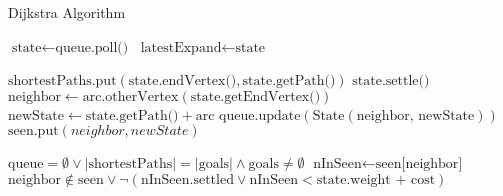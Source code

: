 \begin{algorithm}
    \caption{Dijkstra Algorithm}
    \label{alg:disjkstra_algorithm}
    \begin{algorithmic}[1]
    \State $\text{state} \gets \text{queue.poll()}$
    \State $\text{latestExpand} \gets \text{state}$
    
        \State $\text{shortestPaths.put}(\text{state.endVertex()}, \text{state.getPath()})$
    \EndIf
    \State $\text{state.settle()}$
        \State $\text{neighbor} \gets \text{arc.otherVertex}(\text{state.getEndVertex()})$
        \State $\text{newState} \gets \text{state.getPath()} + \text{arc}$
        \State $\text{queue.update}(\text{State}(\text{neighbor, newState}))$
        \State $\text{seen.put}(neighbor, newState)$
            
        \EndIf
    \EndFor
    \EndProcedure
    \State \Return $\text{queue} = \emptyset \lor |\text{shortestPaths}| = |\text{goals}| \land \text{goals} \neq \emptyset$
    \EndFunction
    \State $\text{nInSeen} \gets \text{seen[neighbor]}$ 
    \State \Return $\text{neighbor} \notin \text{seen} \lor \lnot (\text{nInSeen.settled} \lor \text{nInSeen} < \text{state.weight + cost})$
    \EndFunction
    \end{algorithmic}
\end{algorithm}